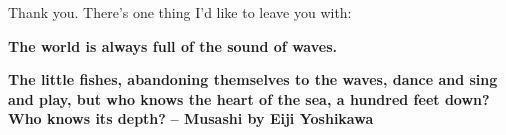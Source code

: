 \documentclass[12pt]{report}
\begin{document}
\vfill\pagebreak

\begin{center}
Thank you. There's one thing I'd like to leave you with: 
\end{center}

\vspace{2in}
            \begin{center}
            \begin{minipage}[l]{10cm}\small
            \textbf{The world is always full of the sound of waves.}\newline

            \textbf{The little fishes, abandoning themselves to the waves, dance and sing and play, but who knows the heart of the sea, a hundred feet down? Who knows its depth?}\newline
            \textbf{-- Musashi by Eiji Yoshikawa}
            \end{minipage}
            \end{center}
\vfill
\end{document}

